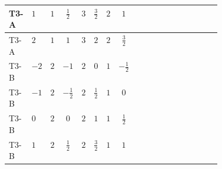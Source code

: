 \documentclass[8pt]{article}
\begin{document}
\begin{landscape}
\begin{longtable}{@{}llcccccc >{\raggedright\arraybackslash}p{0.21\linewidth} >{\raggedright\arraybackslash}p{0.21\linewidth}@{}}
\midrule
T3-A & $1$ & $1$ & $\frac{1}{2}$ & $3$ & $\frac{3}{2}$ & $2$ & $1$ & \scriptsize\adjustbox{max width=\linewidth}{$\begin{gathered} 6 C_{5} Y_d Y_d^\dagger\end{gathered}$} & \scriptsize\adjustbox{max width=\linewidth}{$\begin{gathered} 6 C_{5} Y_u Y_u^\dagger\end{gathered}$} \\
\midrule
T3-A & $2$ & $1$ & $1$ & $3$ & $2$ & $2$ & $\frac{3}{2}$ & \scriptsize\adjustbox{max width=\linewidth}{$\begin{gathered} 6 C_{5} Y_d Y_d^\dagger\end{gathered}$} & \scriptsize\adjustbox{max width=\linewidth}{$\begin{gathered} 6 C_{5} Y_u Y_u^\dagger\end{gathered}$} \\
\midrule
T3-B & $-2$ & $2$ & $-1$ & $2$ & $0$ & $1$ & $-\frac{1}{2}$ & \scriptsize\adjustbox{max width=\linewidth}{$\begin{gathered} 6 C_{5} Y_d Y_d^\dagger\end{gathered}$} & \scriptsize\adjustbox{max width=\linewidth}{$\begin{gathered} 6 C_{5} Y_u Y_u^\dagger\end{gathered}$} \\
\midrule
T3-B & $-1$ & $2$ & $-\frac{1}{2}$ & $2$ & $\frac{1}{2}$ & $1$ & $0$ & \scriptsize\adjustbox{max width=\linewidth}{$\begin{gathered} 6 C_{5} Y_d Y_d^\dagger\end{gathered}$} & \scriptsize\adjustbox{max width=\linewidth}{$\begin{gathered} 6 C_{5} Y_u Y_u^\dagger\end{gathered}$} \\
\midrule
T3-B & $0$ & $2$ & $0$ & $2$ & $1$ & $1$ & $\frac{1}{2}$ & \scriptsize\adjustbox{max width=\linewidth}{$\begin{gathered} 6 C_{5} Y_d Y_d^\dagger\end{gathered}$} & \scriptsize\adjustbox{max width=\linewidth}{$\begin{gathered} 6 C_{5} Y_u Y_u^\dagger\end{gathered}$} \\
\midrule
T3-B & $1$ & $2$ & $\frac{1}{2}$ & $2$ & $\frac{3}{2}$ & $1$ & $1$ & \scriptsize\adjustbox{max width=\linewidth}{$\begin{gathered} 6 C_{5} Y_d Y_d^\dagger\end{gathered}$} & \scriptsize\adjustbox{max width=\linewidth}{$\begin{gathered} 6 C_{5} Y_u Y_u^\dagger\end{gathered}$} \\

\end{longtable}
\end{landscape}
\end{document}

